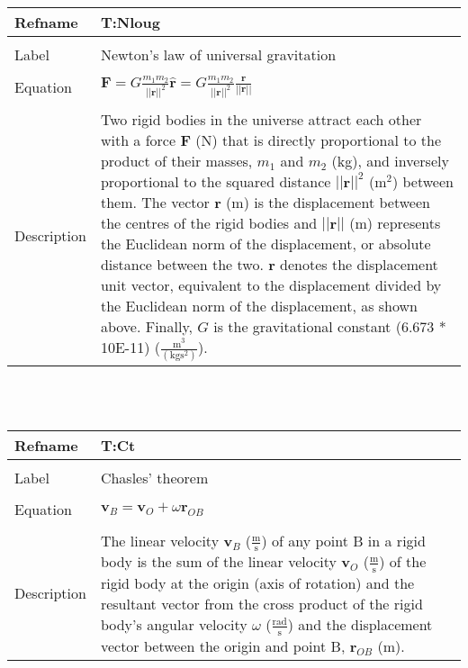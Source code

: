 \documentclass[12pt]{article}
\begin{document}
\noindent \begin{minipage}{\textwidth}
\begin{tabular}{p{} p{}}
\toprule \textbf{Refname} & \textbf{T:Nloug}
\label{T:Nloug}
\\ \midrule \\
Label & Newton's law of universal gravitation
\\ \midrule \\
Equation & $\mathbf{F}=G\frac{m_{1}m_{2}}{||\mathbf{r}||^{2}}\mathbf{\hat{r}}=G\frac{m_{1}m_{2}}{||\mathbf{r}||^{2}}\frac{\mathbf{r}}{||\mathbf{r}||}$
\\ \midrule \\
Description & Two rigid bodies in the universe attract each other with a force $\mathbf{F}$ (N) that is directly proportional to the product of their masses, $m_{1}$ and $m_{2}$ (kg), and inversely proportional to the squared distance $||\mathbf{r}||^{2}$ ($\text{m}^{2}$) between them. The vector $\mathbf{r}$ (m) is the displacement between the centres of the rigid bodies and $||\mathbf{r}||$ (m) represents the Euclidean norm of the displacement, or absolute distance between the two. $\mathbf{\hat{r}}$ denotes the displacement unit vector, equivalent to the displacement divided by the Euclidean norm of the displacement, as shown above. Finally, $G$ is the gravitational constant (6.673 * 10E-11) ($\frac{\text{m}^{3}}{(\text{kg}\text{s}^{2})}$).
\\ \bottomrule \end{tabular}
\end{minipage}\\
~\newline
\noindent \begin{minipage}{\textwidth}
\begin{tabular}{p{} p{}}
\toprule \textbf{Refname} & \textbf{T:Ct}
\label{T:Ct}
\\ \midrule \\
Label & Chasles' theorem
\\ \midrule \\
Equation & $\mathbf{v}_{B}=\mathbf{v}_{O}+\omega{}\mathbf{r}_{OB}$
\\ \midrule \\
Description & The linear velocity $\mathbf{v}_{B}$ ($\frac{\text{m}}{\text{s}}$) of any point B in a rigid body is the sum of the linear velocity $\mathbf{v}_{O}$ ($\frac{\text{m}}{\text{s}}$) of the rigid body at the origin (axis of rotation) and the resultant vector from the cross product of the rigid body's angular velocity $\omega{}$ ($\frac{\text{rad}}{\text{s}}$) and the displacement vector between the origin and point B, $\mathbf{r}_{OB}$ (m).
\\ \bottomrule \end{tabular}
\end{minipage}\\
\end{document}
